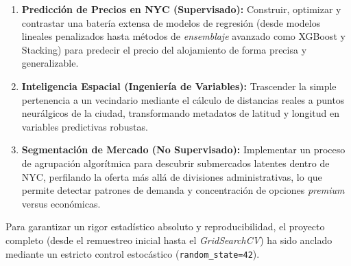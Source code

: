 \begin{enumerate}
    \item \textbf{Predicción de Precios en NYC (Supervisado):} Construir, optimizar y contrastar una batería extensa de modelos de regresión (desde modelos lineales penalizados hasta métodos de \textit{ensemblaje} avanzado como XGBoost \cite{chen2016xgboost} y Stacking) para predecir el precio del alojamiento de forma precisa y generalizable.
    \item \textbf{Inteligencia Espacial (Ingeniería de Variables):} Trascender la simple pertenencia a un vecindario mediante el cálculo de distancias reales a puntos neurálgicos de la ciudad, transformando metadatos de latitud y longitud en variables predictivas robustas.
    \item \textbf{Segmentación de Mercado (No Supervisado):} Implementar un proceso de agrupación algorítmica para descubrir submercados latentes dentro de NYC, perfilando la oferta más allá de divisiones administrativas, lo que permite detectar patrones de demanda y concentración de opciones \textit{premium} versus económicas.
\end{enumerate}

Para garantizar un rigor estadístico absoluto y reproducibilidad, el proyecto completo (desde el remuestreo inicial hasta el \textit{GridSearchCV}) ha sido anclado mediante un estricto control estocástico (\texttt{random\_state=42}).
